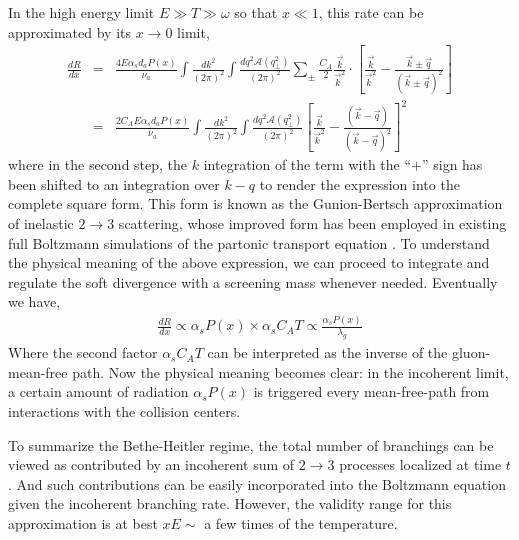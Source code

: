 In the high energy limit $E\gg T \gg \omega$ so that $x\ll 1$, this rate can be approximated by its $x\rightarrow 0$ limit, 
\begin{eqnarray}
\frac{dR}{dx} &=& \frac{4 E\alpha_s d_a P(x)}{\nu_a} \int \frac{dk^2}{(2\pi)^2} \int \frac{dq^2 \mathcal{A}(q_\perp^2)}{(2\pi)^2}  \sum_{\pm}
\frac{C_A}{2} \frac{\vec{k}}{\vec{k}^2}\cdot\left[\frac{\vec{k}}{\vec{k}^2}-\frac{\vec{k}\pm\vec{q}}{(\vec{k}\pm\vec{q})^2}\right] \\
&=& \frac{2 C_A E\alpha_s d_a P(x)}{\nu_a} \int \frac{dk^2}{(2\pi)^2} \int \frac{dq^2 \mathcal{A}(q_\perp^2)}{(2\pi)^2} 
\left[\frac{\vec{k}}{\vec{k}^2}-\frac{(\vec{k}-\vec{q})}{(\vec{k}-\vec{q})^2}\right]^2
\end{eqnarray}
where in the second step, the $k$ integration of the term with the ``$+$'' sign has been shifted to an integration over $k-q$ to render the expression into the complete square form.
This form is known as the Gunion-Bertsch approximation \cite{PhysRevD.25.746} of inelastic $2\rightarrow 3$ scattering, whose improved form \cite{Fochler:2013epa,Uphoff:2014hza} has been employed in existing full Boltzmann simulations of the partonic transport equation \cite{Xu:2004mz,Uphoff:2010sh}.
To understand the physical meaning of the above expression, we can proceed to integrate and regulate the soft divergence with a screening mass whenever needed.
Eventually we have,
\begin{eqnarray}
\frac{dR}{dx} \propto \alpha_s P(x) \times \alpha_s C_A T \propto \frac{\alpha_s P(x)}{\lambda_g}
\label{eq:incoh-dR}
\end{eqnarray}
Where the second factor $\alpha_s C_A T$ can be interpreted as the inverse of the gluon-mean-free path. 
Now the physical meaning becomes clear: in the incoherent limit, a certain amount of radiation $\alpha_s P(x)$ is triggered every mean-free-path from interactions with the collision centers.

To summarize the Bethe-Heitler regime, the total number of branchings can be viewed as contributed by an incoherent sum of $2\rightarrow 3$ processes localized at time $t$.
And such contributions can be easily incorporated into the Boltzmann equation given the incoherent branching rate.
However, the validity range for this approximation is at best $x E \sim$ a few times of the temperature.

